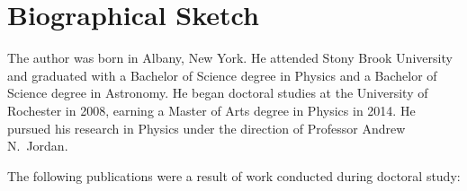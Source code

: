 \chapter*{Biographical Sketch}

The author was born in Albany, New York.  He attended Stony Brook University and graduated with a Bachelor of Science degree in Physics and a Bachelor of Science degree in Astronomy.  He began doctoral studies at the University of Rochester in 2008, earning a Master of Arts degree in Physics in 2014.  He pursued his research in Physics under the direction of Professor Andrew N.~Jordan.

The following publications were a result of work conducted during doctoral study:
\vspace{1cm}




